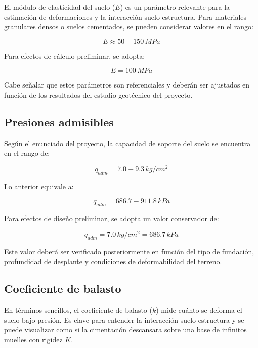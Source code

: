 El módulo de elasticidad del suelo ($E$) es un parámetro relevante para la estimación de deformaciones y la interacción suelo-estructura. Para materiales granulares densos o suelos cementados, se pueden considerar valores en el rango:

\begin{equation}
E \approx 50 - 150 \, MPa
\end{equation}

Para efectos de cálculo preliminar, se adopta:

\begin{equation}
E = 100 \, MPa
\end{equation}

Cabe señalar que estos parámetros son referenciales y deberán ser ajustados en función de los resultados del estudio geotécnico del proyecto.

\subsection{Presiones admisibles}

Según el enunciado del proyecto, la capacidad de soporte del suelo se encuentra en el rango de:

\begin{equation}
q_{adm} = 7.0 - 9.3 \, kg/cm^2
\end{equation}

Lo anterior equivale a:

\begin{equation}
q_{adm} = 686.7 - 911.8 \, kPa
\end{equation}

Para efectos de diseño preliminar, se adopta un valor conservador de:

\begin{equation}
q_{adm} = 7.0 \, kg/cm^2 = 686.7 \, kPa
\end{equation}

Este valor deberá ser verificado posteriormente en función del tipo de fundación, profundidad de desplante y condiciones de deformabilidad del terreno.
\subsection{Coeficiente de balasto}

En términos sencillos, el coeficiente de balasto ($k$) mide cuánto se deforma el suelo bajo presión. Es clave para entender la interacción suelo-estructura y se puede visualizar como si la cimentación descansara sobre una base de infinitos muelles con rigidez $K$.


